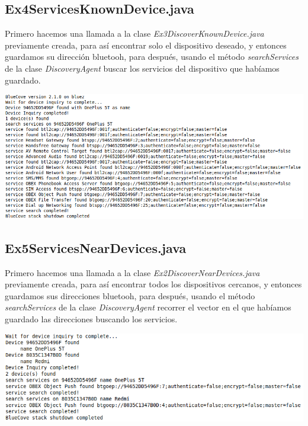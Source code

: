 \documentclass{article}
\begin{document}
\subsection{Ex4ServicesKnownDevice.java}

Primero hacemos una llamada a la clase \textit{Ex3DiscoverKnownDevice.java} previamente creada, para así encontrar solo el dispositivo deseado, y entonces guardamos su dirección bluetooh, para después, usando el método \textit{searchServices} de la clase \textit{DiscoveryAgent} buscar los servicios del dispositivo que habíamos guardado.

\begin{flushleft}
	\includegraphics[scale=0.5]{imagenes/Ex4ServicesKnownDevice.png} 
\end{flushleft}

\subsection{Ex5ServicesNearDevices.java}

Primero hacemos una llamada a la clase \textit{Ex2DiscoverNearDevices.java} previamente creada, para así encontrar todos los dispositivos cercanos, y entonces guardamos sus direcciones bluetooh, para después, usando el método \textit{searchServices} de la clase \textit{DiscoveryAgent} recorrer el vector en el que habíamos guardado las direcciones buscando los servicios.

\begin{flushleft}
	\includegraphics[scale=0.5]{imagenes/Ex5ServicesNearDevices.png} 
\end{flushleft}
\end{document}
